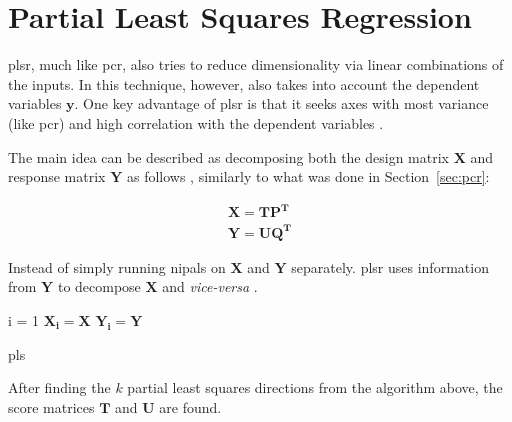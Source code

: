 \newpage
\section{Partial Least Squares Regression}
\label{sec:plsr}

\acrshort{plsr}, much like \acrshort{pcr}, also tries to reduce dimensionality via linear combinations of the inputs. In this technique, however, also takes into account the dependent variables $\mathbf{y}$. One key advantage of \acrshort{plsr} is that it seeks axes with most variance (like \acrshort{pcr}) and high correlation with the dependent variables \cite{friedman2001}.

The main idea can be described as decomposing both the design matrix $\mathbf{X}$ and response matrix $\mathbf{Y}$ as follows \cite{ng2013}, similarly to what was done in Section~\ref{sec:pcr}:



\begin{align}
	\mathbf{X=TP^T} \\
	\mathbf{Y = UQ^T}
\end{align}

Instead of simply running \acrshort{nipals} on $\mathbf{X}$ and $\mathbf{Y}$ separately. \acrshort{plsr} uses information from $\mathbf{Y}$ to decompose $\mathbf{X}$ and \textit{vice-versa} \cite{ng2013}.

\begin{algorithm}[H]
	\SetAlgoLined
	i = 1\;
	$\mathbf{X_i = X}$\;
	$\mathbf{Y_i = Y}$\;
	
\caption{\acrfull{pls}}
\end{algorithm}

After finding the $k$ partial least squares directions from the algorithm above, the score matrices $\mathbf{T}$ and $\mathbf{U}$ are found.

